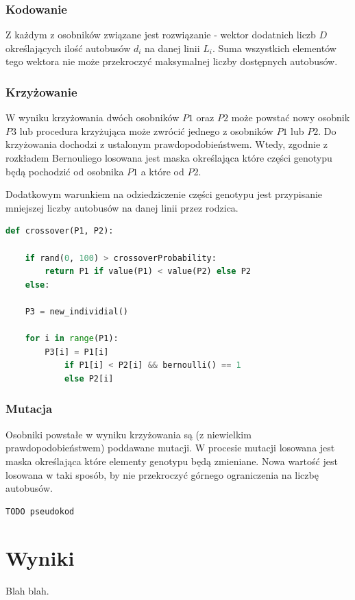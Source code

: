 \documentclass[polish,12pt]{aghthesis}
\begin{document}
\subsubsection{Kodowanie}
Z każdym z osobników związane jest rozwiązanie - wektor dodatnich liczb $D$ określających ilość autobusów $d_i$ na danej linii $L_i$. Suma wszystkich elementów tego wektora nie może przekroczyć maksymalnej liczby dostępnych autobusów.

\subsubsection{Krzyżowanie}
W wyniku krzyżowania dwóch osobników $P1$ oraz $P2$ może powstać nowy osobnik $P3$ lub procedura krzyżująca może zwrócić jednego z osobników $P1$ lub $P2$. Do krzyżowania dochodzi z ustalonym prawdopodobieństwem. Wtedy, zgodnie z rozkładem Bernouliego losowana jest maska określająca które części genotypu będą pochodzić od osobnika $P1$ a które od $P2$.

Dodatkowym warunkiem na odziedziczenie części genotypu jest przypisanie mniejszej liczby autobusów na danej linii przez rodzica.

\begin{lstlisting}[language=Python]
def crossover(P1, P2):

	if rand(0, 100) > crossoverProbability:
		return P1 if value(P1) < value(P2) else P2
	else:
	
	P3 = new_individial()
	
	for i in range(P1):
		P3[i] = P1[i]
			if P1[i] < P2[i] && bernoulli() == 1
			else P2[i]

\end{lstlisting}

\subsubsection{Mutacja}
Osobniki powstałe w wyniku krzyżowania są (z niewielkim prawdopodobieństwem) poddawane mutacji. W procesie mutacji losowana jest maska określająca które elementy genotypu będą zmieniane. Nowa wartość jest losowana w taki sposób, by nie przekroczyć górnego ograniczenia na liczbę autobusów.

\begin{lstlisting}[language=Python]
TODO pseudokod
\end{lstlisting}

\newpage




\section{Wyniki}
Blah blah.

\newpage



\nocite{bib-transit-oriented}


\newpage

\listoffigures
\newpage
\end{document}
